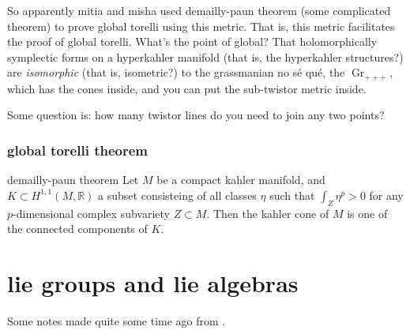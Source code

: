 So apparently mitia and misha used demailly-paun theorem (some complicated theorem) to prove global torelli using this metric. That is, this metric facilitates the proof of global torelli. What's the point of global? That holomorphically symplectic forms on a hyperkahler manifold (that is, the hyperkahler structures?) are \textit{isomorphic} (that is, isometric?) to the grassmanian no sé qué, the \(\operatorname{Gr}_{+++}\), which has the cones inside, and you can put the sub-twistor metric inside.

Some question is: how many twistor lines do you need to join any two points?

\subsection{global torelli theorem}

\begin{thing6}{demailly-paun theorem}\leavevmode
Let \(M\) be a compact kahler manifold, and \(K \subset H^{1,1}(M,\mathbb{R})\) a subset consisteing of all classes \(\eta\) such that \(\int_Z \eta^p >0\) for any \(p\)-dimensional complex subvariety \(Z \subset M\). Then the kahler cone of \(M\) is one of the connected components of \(K\).
\end{thing6}

\chapter{lie groups and lie algebras}

Some notes made quite some time ago from  \cite{les}.

